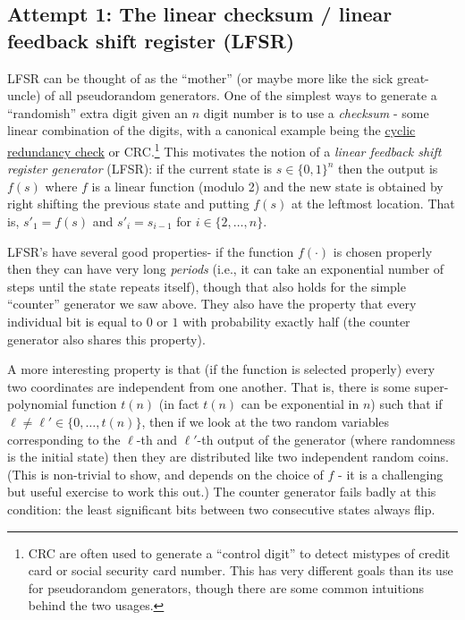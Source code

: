 \subsection{Attempt 1: The linear checksum / linear feedback shift
register (LFSR)}\label{3-Attempt--The-linear-ch}

LFSR can be thought of as the ``mother'' (or maybe more like the sick
great-uncle) of all pseudorandom generators. One of the simplest ways to
generate a ``randomish'' extra digit given an \(n\) digit number is to
use a \emph{checksum} - some linear combination of the digits, with a
canonical example being the
\href{https://en.wikipedia.org/wiki/Cyclic_redundancy_check}{cyclic
redundancy check} or CRC.\footnote{CRC are often used to generate a
  ``control digit'' to detect mistypes of credit card or social security
  card number. This has very different goals than its use for
  pseudorandom generators, though there are some common intuitions
  behind the two usages.} This motivates the notion of a \emph{linear
feedback shift register generator} (LFSR): if the current state is
\(s\in\{0,1\}^n\) then the output is \(f(s)\) where \(f\) is a linear
function (modulo 2) and the new state is obtained by right shifting the
previous state and putting \(f(s)\) at the leftmost location. That is,
\(s'_1 = f(s)\) and \(s'_i = s_{i-1}\) for \(i\in\{2,\ldots,n\}\).

LFSR's have several good properties- if the function \(f(\cdot)\) is
chosen properly then they can have very long \emph{periods} (i.e., it
can take an exponential number of steps until the state repeats itself),
though that also holds for the simple ``counter'' generator we saw
above. They also have the property that every individual bit is equal to
\(0\) or \(1\) with probability exactly half (the counter generator also
shares this property).

A more interesting property is that (if the function is selected
properly) every two coordinates are independent from one another. That
is, there is some super-polynomial function \(t(n)\) (in fact \(t(n)\)
can be exponential in \(n\)) such that if
\(\ell \neq \ell' \in \{0,\ldots, t(n) \}\), then if we look at the two
random variables corresponding to the \(\ell\)-th and \(\ell'\)-th
output of the generator (where randomness is the initial state) then
they are distributed like two independent random coins. (This is
non-trivial to show, and depends on the choice of \(f\) - it is a
challenging but useful exercise to work this out.) The counter generator
fails badly at this condition: the least significant bits between two
consecutive states always flip.

